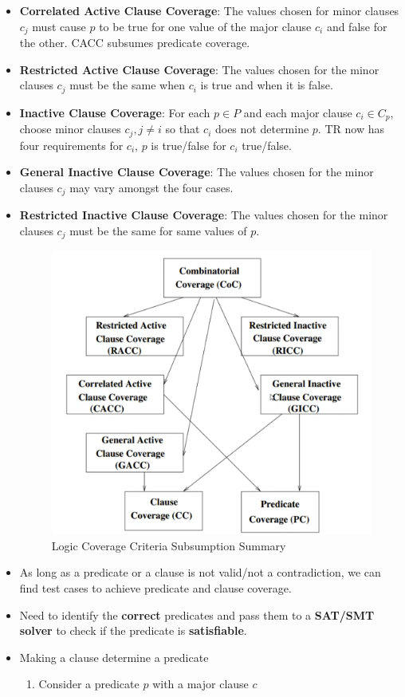 \documentclass[a4paper]{article}
\begin{document}
\begin{itemize}
    \item \textbf{Correlated Active Clause Coverage}: The values chosen for minor clauses $c_j$ must cause $p$ to be true for one value of the major clause $c_i$ and false for the other. CACC subsumes predicate coverage.
    \item \textbf{Restricted Active Clause Coverage}: The values chosen for the minor clauses $c_j$ must be the same when $c_i$ is true and when it is false.
    \item \textbf{Inactive Clause Coverage}: For each $p\in P$ and each major clause $c_i\in C_p$, choose minor clauses $c_j, j\neq i$ so that $c_i$ does not determine $p$. TR now has four requirements for $c_i$, $p$ is true/false for $c_i$ true/false.
    \item \textbf{General Inactive Clause Coverage}: The values chosen for the minor clauses $c_j$ may vary amongst the four cases.
    \item \textbf{Restricted Inactive Clause Coverage}: The values chosen for the minor clauses $c_j$ must be the same for same values of $p$.
    \begin{figure}[H]
        \centering
        \includegraphics[width=0.5\linewidth]{Degree//static/ST_logic_subsume_summary.png}
        \caption{Logic Coverage Criteria Subsumption Summary}
    \end{figure}
    \item As long as a predicate or a clause is not valid/not a contradiction, we can find test cases to achieve predicate and clause coverage.
    \item Need to identify the \textbf{correct} predicates and pass them to a \textbf{SAT/SMT solver} to check if the predicate is \textbf{satisfiable}.
    \item Making a clause determine a predicate
    \begin{enumerate}
        \item Consider a predicate $p$ with a major clause $c$

\end{enumerate}
\end{itemize}
\end{document}
